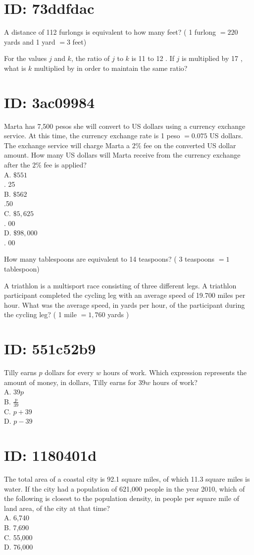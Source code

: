 \section*{ID: 73ddfdac}
A distance of 112 furlongs is equivalent to how many feet? ( 1 furlong $=220$ yards and 1 yard $=3$ feet)

For the values $j$ and $k$, the ratio of $j$ to $k$ is 11 to 12 . If $j$ is multiplied by 17 , what is $k$ multiplied by in order to maintain the same ratio?

\section*{ID: 3ac09984}
Marta has 7,500 pesos she will convert to US dollars using a currency exchange service. At this time, the currency exchange rate is 1 peso $=0.075$ US dollars. The exchange service will charge Marta a $2 \%$ fee on the converted US dollar amount. How many US dollars will Marta receive from the currency exchange after the $2 \%$ fee is applied?\\
A. $\$ 551$\\
. 25\\
B. $\$ 562$\\
.50\\
C. $\$ 5,625$\\
. 00\\
D. $\$ 98,000$\\
. 00

How many tablespoons are equivalent to 14 teaspoons? ( 3 teaspoons $=1$ tablespoon)

A triathlon is a multisport race consisting of three different legs. A triathlon participant completed the cycling leg with an average speed of 19.700 miles per hour. What was the average speed, in yards per hour, of the participant during the cycling leg? ( 1 mile $=1,760$ yards )

\section*{ID: 551c52b9}
Tilly earns $p$ dollars for every $w$ hours of work. Which expression represents the amount of money, in dollars, Tilly earns for $39 w$ hours of work?\\
A. $39 p$\\
B. $\frac{p}{39}$\\
C. $p+39$\\
D. $p-39$

\section*{ID: 1180401d}
The total area of a coastal city is 92.1 square miles, of which 11.3 square miles is water. If the city had a population of 621,000 people in the year 2010, which of the following is closest to the population density, in people per square mile of land area, of the city at that time?\\
A. 6,740\\
B. 7,690\\
C. 55,000\\
D. 76,000

